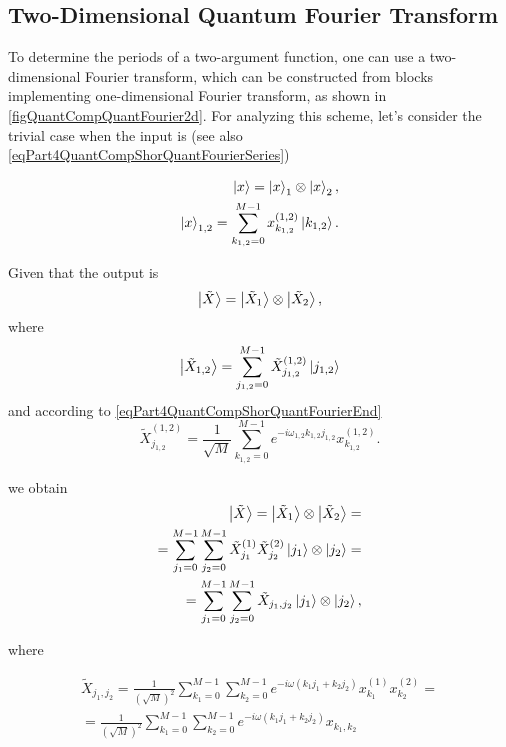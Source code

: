 \subsection{Two-Dimensional Quantum Fourier Transform}



To determine the periods of a two-argument function, one can use a two-dimensional Fourier transform, which can be constructed from blocks implementing one-dimensional Fourier transform, as shown in \autoref{figQuantCompQuantFourier2d}. For analyzing this scheme, let's consider the trivial case when the input is (see also \eqref{eqPart4QuantCompShorQuantFourierSeries})

\begin{eqnarray}
\ket{x} = \ket{x}_1 \otimes \ket{x}_2,
\nonumber \\
\ket{x}_{1,2} = \sum_{k_{1,2} = 0}^{M-1} x_{k_{1,2}}^{(1,2)} \ket{k_{1,2}}.
\nonumber
\end{eqnarray}

Given that the output is
\[
\ket{\tilde{X}} = \ket{\tilde{X}_1} \otimes \ket{\tilde{X}_2},
\]
where
\[
\ket{\tilde{X}_{1,2}} = \sum_{j_{1,2} = 0}^{M-1} \tilde{X}_{j_{1,2}}^{(1,2)} \ket{j_{1,2}}
\]
and according to \eqref{eqPart4QuantCompShorQuantFourierEnd}
\[
\tilde{X}_{j_{1,2}}^{(1,2)} = \frac{1}{\sqrt{M}}\sum_{k_{1,2} = 0}^{M - 1}e^{-i \omega_{1,2} k_{1,2} j_{1,2}} x_{k_{1,2}}^{(1,2)}.
\]

we obtain
\begin{eqnarray}
\ket{\tilde{X}} = \ket{\tilde{X}_1} \otimes \ket{\tilde{X}_2} = 
\nonumber \\
= \sum_{j_1 = 0}^{M-1}\sum_{j_2 = 0}^{M-1}
\tilde{X}_{j_{1}}^{(1)} \tilde{X}_{j_{2}}^{(2)} \ket{j_1} \otimes
\ket{j_2} =
\nonumber \\
= \sum_{j_1 = 0}^{M-1}\sum_{j_2 = 0}^{M-1}
\tilde{X}_{j_{1},j_{2}} \ket{j_1} \otimes
\ket{j_2}, 
\nonumber
\end{eqnarray}

where

\begin{eqnarray}
\tilde{X}_{j_{1},j_{2}} = \frac{1}{\left( \sqrt{M} \right)^2} 
\sum_{k_{1} = 0}^{M - 1}\sum_{k_{2} = 0}^{M - 1}
e^{-i \omega \left( k_{1} j_{1} + k_{2} j_{2}\right)}
x_{k_1}^{(1)}x_{k_2}^{(2)} =
\nonumber \\
= \frac{1}{\left( \sqrt{M} \right)^2}
\sum_{k_{1} = 0}^{M - 1}\sum_{k_{2} = 0}^{M - 1}
e^{-i \omega \left( k_{1} j_{1} + k_{2} j_{2}\right)}
x_{k_1, k_2}
\nonumber
\end{eqnarray}

